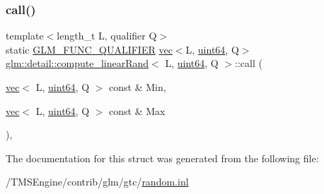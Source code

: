 \subsubsection{\texorpdfstring{call()}{call()}}
{\footnotesize\ttfamily template$<$length\+\_\+t L, qualifier Q$>$ \\
static \hyperlink{setup_8hpp_a33fdea6f91c5f834105f7415e2a64407}{G\+L\+M\+\_\+\+F\+U\+N\+C\+\_\+\+Q\+U\+A\+L\+I\+F\+I\+ER} \hyperlink{structglm_1_1vec}{vec}$<$L, \hyperlink{namespaceglm_1_1detail_adec4b19bf4982125e122db2fe03c5810}{uint64}, Q$>$ \hyperlink{structglm_1_1detail_1_1compute__linear_rand}{glm\+::detail\+::compute\+\_\+linear\+Rand}$<$ L, \hyperlink{namespaceglm_1_1detail_adec4b19bf4982125e122db2fe03c5810}{uint64}, Q $>$\+::call (\begin{DoxyParamCaption}\item[{\hyperlink{structglm_1_1vec}{vec}$<$ L, \hyperlink{namespaceglm_1_1detail_adec4b19bf4982125e122db2fe03c5810}{uint64}, Q $>$ const \&}]{Min,  }\item[{\hyperlink{structglm_1_1vec}{vec}$<$ L, \hyperlink{namespaceglm_1_1detail_adec4b19bf4982125e122db2fe03c5810}{uint64}, Q $>$ const \&}]{Max }\end{DoxyParamCaption})\hspace{0.3cm}{\ttfamily [inline]}, {\ttfamily [static]}}



The documentation for this struct was generated from the following file\+:\begin{DoxyCompactItemize}
\item 
/\+T\+M\+S\+Engine/contrib/glm/gtc/\hyperlink{random_8inl}{random.\+inl}\end{DoxyCompactItemize}

